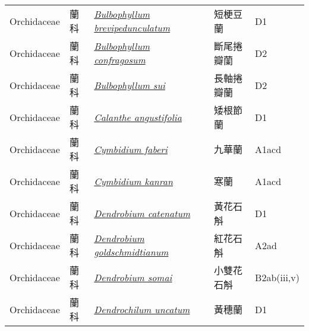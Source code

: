{\begin{longtable}{p{2.5cm}p{2.5cm}p{4.5cm}p{2.5cm}p{3cm}}
    Orchidaceae & 蘭科 & \href{http://www.theplantlist.org/tpl1.1/search?q=Bulbophyllum+brevipedunculatum}{\textit{Bulbophyllum brevipedunculatum} } & 短梗豆蘭 & D1 \index{Bulbophyllum@\textit{Bulbophyllum}!brevipedunculatum@\textit{brevipedunculatum}}  \index{短梗豆蘭} \\
    Orchidaceae & 蘭科 & \href{http://www.theplantlist.org/tpl1.1/search?q=Bulbophyllum+confragosum}{\textit{Bulbophyllum confragosum} } & 斷尾捲瓣蘭 & D2 \index{Bulbophyllum@\textit{Bulbophyllum}!confragosum@\textit{confragosum}}  \index{斷尾捲瓣蘭} \\
    Orchidaceae & 蘭科 & \href{http://www.theplantlist.org/tpl1.1/search?q=Bulbophyllum+sui}{\textit{Bulbophyllum sui} } & 長軸捲瓣蘭 & D2 \index{Bulbophyllum@\textit{Bulbophyllum}!sui@\textit{sui}}  \index{長軸捲瓣蘭} \\
    Orchidaceae & 蘭科 & \href{http://www.theplantlist.org/tpl1.1/search?q=Calanthe+angustifolia}{\textit{Calanthe angustifolia} } & 矮根節蘭 & D1 \index{Calanthe@\textit{Calanthe}!angustifolia@\textit{angustifolia}}  \index{矮根節蘭} \\
    Orchidaceae & 蘭科 & \href{http://www.theplantlist.org/tpl1.1/search?q=Cymbidium+faberi}{\textit{Cymbidium faberi} } & 九華蘭 & A1acd \index{Cymbidium@\textit{Cymbidium}!faberi@\textit{faberi}}  \index{九華蘭} \\
    Orchidaceae & 蘭科 & \href{http://www.theplantlist.org/tpl1.1/search?q=Cymbidium+kanran}{\textit{Cymbidium kanran} } & 寒蘭 & A1acd \index{Cymbidium@\textit{Cymbidium}!kanran@\textit{kanran}}  \index{寒蘭} \\
    Orchidaceae & 蘭科 & \href{http://www.theplantlist.org/tpl1.1/search?q=Dendrobium+catenatum}{\textit{Dendrobium catenatum} } & 黃花石斛 & D1 \index{Dendrobium@\textit{Dendrobium}!catenatum@\textit{catenatum}}  \index{黃花石斛} \\
    Orchidaceae & 蘭科 & \href{http://www.theplantlist.org/tpl1.1/search?q=Dendrobium+goldschmidtianum}{\textit{Dendrobium goldschmidtianum} } & 紅花石斛 & A2ad \index{Dendrobium@\textit{Dendrobium}!goldschmidtianum@\textit{goldschmidtianum}}  \index{紅花石斛} \\
    Orchidaceae & 蘭科 & \href{http://www.theplantlist.org/tpl1.1/search?q=Dendrobium+somai}{\textit{Dendrobium somai} } & 小雙花石斛 & B2ab(iii,v) \index{Dendrobium@\textit{Dendrobium}!somai@\textit{somai}}  \index{小雙花石斛} \\
    Orchidaceae & 蘭科 & \href{http://www.theplantlist.org/tpl1.1/search?q=Dendrochilum+uncatum}{\textit{Dendrochilum uncatum} } & 黃穗蘭 & D1 \index{Dendrochilum@\textit{Dendrochilum}!uncatum@\textit{uncatum}}  \index{黃穗蘭} \\

\end{longtable}}
